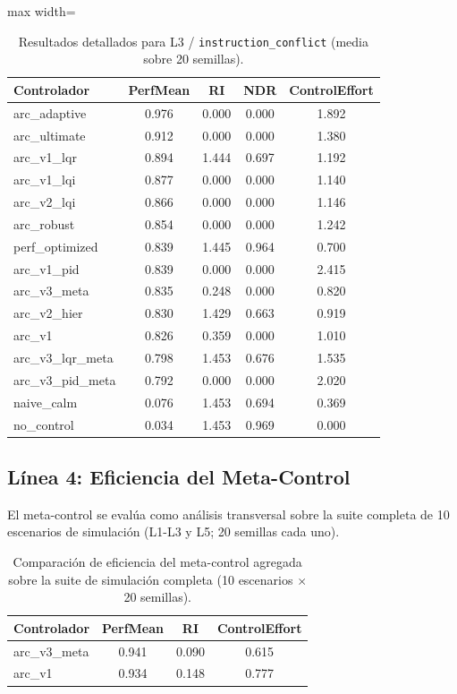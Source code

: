 \documentclass{article}
\begin{document}
\begin{table}[H]
\centering
\footnotesize
\caption{Resultados detallados para L3 / \texttt{instruction\_conflict} (media sobre 20 semillas).}
\label{tab:g8_instruction_conflict}
\begin{adjustbox}{max width=\textwidth}
\begin{tabular}{@{}lcccc@{}}
\toprule
Controlador & PerfMean & RI & NDR & ControlEffort \\ \midrule
arc\_adaptive & 0.976 & 0.000 & 0.000 & 1.892 \\
arc\_ultimate & 0.912 & 0.000 & 0.000 & 1.380 \\
arc\_v1\_lqr & 0.894 & 1.444 & 0.697 & 1.192 \\
arc\_v1\_lqi & 0.877 & 0.000 & 0.000 & 1.140 \\
arc\_v2\_lqi & 0.866 & 0.000 & 0.000 & 1.146 \\
arc\_robust & 0.854 & 0.000 & 0.000 & 1.242 \\
perf\_optimized & 0.839 & 1.445 & 0.964 & 0.700 \\
arc\_v1\_pid & 0.839 & 0.000 & 0.000 & 2.415 \\
arc\_v3\_meta & 0.835 & 0.248 & 0.000 & 0.820 \\
arc\_v2\_hier & 0.830 & 1.429 & 0.663 & 0.919 \\
arc\_v1 & 0.826 & 0.359 & 0.000 & 1.010 \\
arc\_v3\_lqr\_meta & 0.798 & 1.453 & 0.676 & 1.535 \\
arc\_v3\_pid\_meta & 0.792 & 0.000 & 0.000 & 2.020 \\
naive\_calm & 0.076 & 1.453 & 0.694 & 0.369 \\
no\_control & 0.034 & 1.453 & 0.969 & 0.000 \\ \bottomrule
\end{tabular}
\end{adjustbox}
\end{table}

\FloatBarrier
\subsection{Línea 4: Eficiencia del Meta-Control}

El meta-control se evalúa como análisis transversal sobre la suite completa de 10 escenarios de simulación (L1-L3 y L5; 20 semillas cada uno).

\begin{table}[H]
\centering
\footnotesize
\caption{Comparación de eficiencia del meta-control agregada sobre la suite de simulación completa (10 escenarios $\times$ 20 semillas).}
\label{tab:g9_meta_control}
\begin{tabular}{@{}lccc@{}}
\toprule
Controlador & PerfMean & RI & ControlEffort \\ \midrule
arc\_v3\_meta & 0.941 & 0.090 & 0.615 \\
arc\_v1 & 0.934 & 0.148 & 0.777 \\ \bottomrule
\end{tabular}
\end{table}
\end{document}
